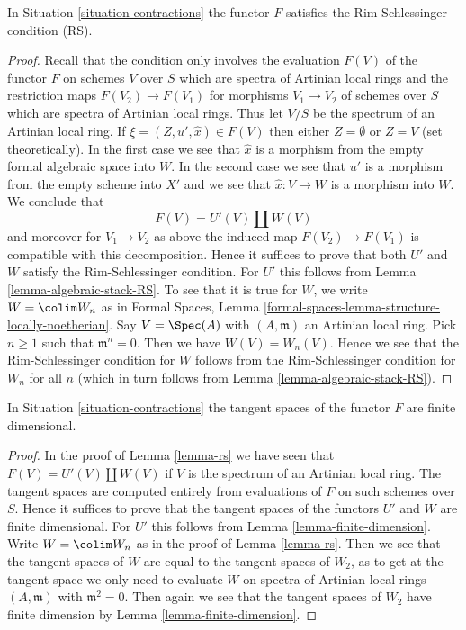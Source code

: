 \begin{lemma}
\label{lemma-rs}
In Situation \ref{situation-contractions} the functor $F$ satisfies
the Rim-Schlessinger condition (RS).
\end{lemma}

\begin{proof}
Recall that the condition only involves the evaluation $F(V)$ of the functor
$F$ on schemes $V$ over $S$ which are spectra of Artinian local rings
and the restriction maps $F(V_2) \to F(V_1)$ for morphisms $V_1 \to V_2$
of schemes over $S$ which are spectra of Artinian local rings.
Thus let $V/S$ be the spectrum of an Artinian local ring.
If $\xi = (Z, u', \hat x) \in F(V)$ then either $Z = \emptyset$
or $Z = V$ (set theoretically). In the first case we see that
$\hat x$ is a morphism from the empty formal algebraic space
into $W$. In the second case we see that $u'$ is a morphism from
the empty scheme into $X'$ and we see that $\hat x : V \to W$
is a morphism into $W$. We conclude that
$$
F(V) = U'(V) \amalg W(V)
$$
and moreover for $V_1 \to V_2$ as above the induced map
$F(V_2) \to F(V_1)$ is compatible with this decomposition.
Hence it suffices to prove that both $U'$ and $W$ satisfy the
Rim-Schlessinger condition. For $U'$ this follows from
Lemma \ref{lemma-algebraic-stack-RS}.
To see that it is true for $W$, we write $W = \colim W_n$ as in
Formal Spaces, Lemma
\ref{formal-spaces-lemma-structure-locally-noetherian}.
Say $V = \Spec(A)$ with $(A, \mathfrak m)$ an Artinian local ring.
Pick $n \geq 1$ such that $\mathfrak m^n = 0$. Then we have
$W(V) = W_n(V)$. Hence we see that the Rim-Schlessinger condition
for $W$ follows from the Rim-Schlessinger condition for $W_n$ for
all $n$ (which in turn follows from
Lemma \ref{lemma-algebraic-stack-RS}).
\end{proof}

\begin{lemma}
\label{lemma-finite-dim}
In Situation \ref{situation-contractions} the tangent spaces of
the functor $F$ are finite dimensional.
\end{lemma}

\begin{proof}
In the proof of Lemma \ref{lemma-rs} we have seen that
$F(V) = U'(V) \amalg W(V)$ if $V$ is the spectrum of an Artinian
local ring. The tangent spaces are computed entirely from evaluations
of $F$ on such schemes over $S$.
Hence it suffices to prove that the tangent spaces
of the functors $U'$ and $W$ are finite dimensional.
For $U'$ this follows from
Lemma \ref{lemma-finite-dimension}.
Write $W = \colim W_n$ as in the proof of Lemma \ref{lemma-rs}.
Then we see that the tangent spaces of $W$ are equal to the
tangent spaces of $W_2$, as to get at the tangent space
we only need to evaluate $W$ on spectra of Artinian local
rings $(A, \mathfrak m)$ with $\mathfrak m^2 = 0$.
Then again we see that the tangent spaces of $W_2$ have
finite dimension by
Lemma \ref{lemma-finite-dimension}.
\end{proof}

